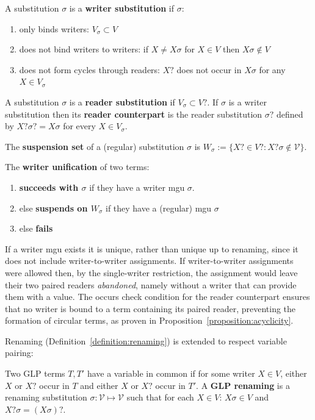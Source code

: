 \documentclass[runningheads,thm-restate]{llncs}
\newcommand{\temph}[1]{\textbf{#1}}  %
\newcommand{\calV}{\mathcal{V}}
\begin{document}
\begin{definition}\label{definition:glp-unification}

A substitution $\sigma$ is a \temph{writer substitution} if  $\sigma$: 
\begin{enumerate}
    \item only binds writers: $V_\sigma \subset V$
    \item does not bind writers to writers: if $X\ne X\sigma$ for $X\in V$ then $X\sigma\notin V$
    \item does not form cycles through readers:  $X?$ does not occur in $X\sigma$ for any $X \in V_\sigma$
\end{enumerate}
A substitution $\sigma$ is a \temph{reader substitution} if $V_\sigma \subset V?$.
If $\sigma$ is a writer substitution then its \temph{reader counterpart} is the reader substitution  $\sigma?$  defined by $X?\sigma? = X\sigma$ for every $X\in V_\sigma$.

The \temph{suspension set} of a (regular) substitution $\sigma$ is $W_\sigma:= \{X?\in V? : X?\sigma \notin \calV\}$.

The \temph{writer unification} of two terms:
\begin{enumerate}
    \item \temph{succeeds with $\sigma$} if they have a writer mgu $\sigma$.
    \item else \temph{suspends on $W_\sigma$} if they have a (regular) mgu $\sigma$
    \item else \temph{fails}
\end{enumerate}
\end{definition}
\begin{remark}
If a writer mgu exists it is unique, rather than unique up to renaming,  since it does not include writer-to-writer assignments.
If writer-to-writer assignments were allowed then, by the single-writer restriction, the assignment would leave their two paired readers \emph{abandoned}, namely without a writer that can provide them with a value.   
The occurs check condition for the reader counterpart ensures that no writer is bound to a term containing its paired reader, preventing the formation of circular terms, as proven in Proposition~\ref{proposition:acyclicity}.
\end{remark}

Renaming  (Definition~\ref{definition:renaming}) is extended to respect variable pairing:
\begin{definition}\label{definition:glp-renaming}
 Two GLP terms $T, T'$ have a variable in common if for some writer $X\in V$, either $X$ or $X?$ occur in $T$ and either $X$ or $X?$ occur in $T'$. A \temph{GLP renaming} is a renaming substitution $\sigma: \mathcal{V} \mapsto \mathcal{V}$ such that for each $X\in V$: $X\sigma \in V$ and $X?\sigma = (X\sigma)?$.
\end{definition}
\end{document}
